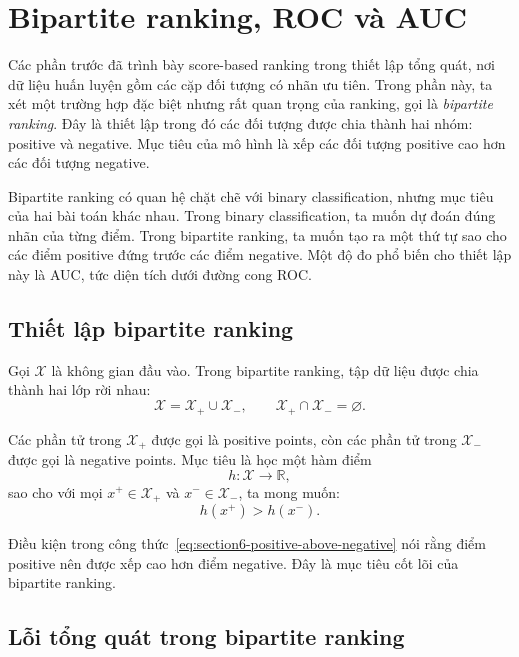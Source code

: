 \section{Bipartite ranking, ROC và AUC}

Các phần trước đã trình bày score-based ranking trong thiết lập tổng quát, nơi dữ liệu huấn luyện gồm các cặp đối tượng có nhãn ưu tiên. Trong phần này, ta xét một trường hợp đặc biệt nhưng rất quan trọng của ranking, gọi là \textit{bipartite ranking}. Đây là thiết lập trong đó các đối tượng được chia thành hai nhóm: positive và negative. Mục tiêu của mô hình là xếp các đối tượng positive cao hơn các đối tượng negative.

Bipartite ranking có quan hệ chặt chẽ với binary classification, nhưng mục tiêu của hai bài toán khác nhau. Trong binary classification, ta muốn dự đoán đúng nhãn của từng điểm. Trong bipartite ranking, ta muốn tạo ra một thứ tự sao cho các điểm positive đứng trước các điểm negative. Một độ đo phổ biến cho thiết lập này là AUC, tức diện tích dưới đường cong ROC.

\subsection{Thiết lập bipartite ranking}

Gọi \(\mathcal{X}\) là không gian đầu vào. Trong bipartite ranking, tập dữ liệu được chia thành hai lớp rời nhau:
\[
    \mathcal{X}
    =
    \mathcal{X}_{+}
    \cup
    \mathcal{X}_{-},
    \qquad
    \mathcal{X}_{+}
    \cap
    \mathcal{X}_{-}
    =
    \varnothing.
\]

Các phần tử trong \(\mathcal{X}_{+}\) được gọi là positive points, còn các phần tử trong \(\mathcal{X}_{-}\) được gọi là negative points. Mục tiêu là học một hàm điểm
\[
    h:\mathcal{X}\rightarrow\mathbb{R},
\]
sao cho với mọi \(x^{+}\in\mathcal{X}_{+}\) và \(x^{-}\in\mathcal{X}_{-}\), ta mong muốn:
\begin{equation}
    h(x^{+}) > h(x^{-}).
    \label{eq:section6-positive-above-negative}
\end{equation}

Điều kiện trong công thức~\eqref{eq:section6-positive-above-negative} nói rằng điểm positive nên được xếp cao hơn điểm negative. Đây là mục tiêu cốt lõi của bipartite ranking.

\subsection{Lỗi tổng quát trong bipartite ranking}

